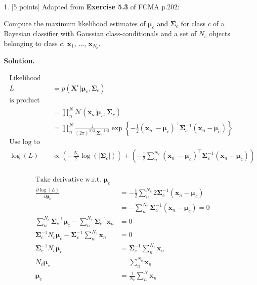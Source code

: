 \documentclass[10pt]{article}
\begin{document}
\begin{itemize}

\item[1.]  [5 points]  %
Adapted from {\bf Exercise 5.3} of FCMA p.202:

Compute the maximum likelihood estimates of $\boldsymbol{\mu}_c$ and $\boldsymbol{\Sigma}_c$ for class $c$ of a Bayesian classifier with Gaussian class-conditionals and a set of $N_c$ objects belonging to class $c$, $\mathbf{x}_1$, ..., $\mathbf{x}_{N_c}$. 

{\bf Solution.} 

\begin{eqnarray*}
\begin{aligned}
%
%
\text{Likelihood}
\\
L &= p(\mathbf{X}^c|\boldsymbol{\mu}_c, \boldsymbol{\Sigma}_c)
\\
\text{is product of (Gaussian) probabilities}
\\
&= \prod_n^N \mathcal{N} (\mathbf{x}_n|\boldsymbol{\mu}_c, \boldsymbol{\Sigma}_c)
\\
&= \prod_n^N 
\frac{1}{(2 \pi)^{N/2} | \boldsymbol {\Sigma}_c |^{1/2}} 
\exp 
\left\{ 
-\frac{1}{2} (\mathbf{x}_n\ - \boldsymbol {\mu}_c)^\top \boldsymbol {\Sigma}_c^{-1} (\mathbf{x}_n - \boldsymbol {\mu}_c)
\right\}
\\
% 
%
\text{Use log to handle exponent}
\\
\log(L) &\propto 
\left( - \frac{N_c}{2} \log(|\boldsymbol {\Sigma}_c|) \right)
+
\left(
-\frac{1}{2} \sum_n^{N_c} (\mathbf{x}_n\ - \boldsymbol {\mu}_c)^\top \boldsymbol {\Sigma}_c^{-1} (\mathbf{x}_n - \boldsymbol {\mu}_c)
\right)
\end{aligned}
\end{eqnarray*}

\begin{eqnarray*}
\begin{aligned}
%
%
\text{Take derivative w.r.t. $\boldsymbol \mu_c$}
\\
\frac{\partial \log(L)}{\partial \boldsymbol \mu_c} 
&= -\frac{1}{2} \sum_n^{N_c} 2 \boldsymbol {\Sigma}_c^{-1} (\mathbf{x}_n - \boldsymbol {\mu}_c) 
\\
&= - \sum_n^{N_c} \boldsymbol {\Sigma}_c^{-1} (\mathbf{x}_n - \boldsymbol {\mu}_c) = 0
\\
\sum_n^{N_c} \boldsymbol {\Sigma}_c^{-1} \boldsymbol {\mu}_c - \sum_n^{N_c} \boldsymbol {\Sigma}_c^{-1} \mathbf{x}_n  &= 0
\\
\boldsymbol {\Sigma}_c^{-1} N_c \boldsymbol {\mu}_c - \boldsymbol {\Sigma}_c^{-1} \sum_n^{N_c} \mathbf{x}_n &= 0
\\
\boldsymbol {\Sigma}_c^{-1} N_c \boldsymbol {\mu}_c &= \boldsymbol {\Sigma}_c^{-1} \sum_n^{N_c} \mathbf{x}_n
\\
N_c \boldsymbol {\mu}_c &= \sum_n^{N_c} \mathbf{x}_n
\\
\boldsymbol {\mu}_c &= \frac{1}{N_c} \sum_n^N  \mathbf{x}_n 
\end{aligned}
\end{eqnarray*}


\end{itemize}
\end{document}
